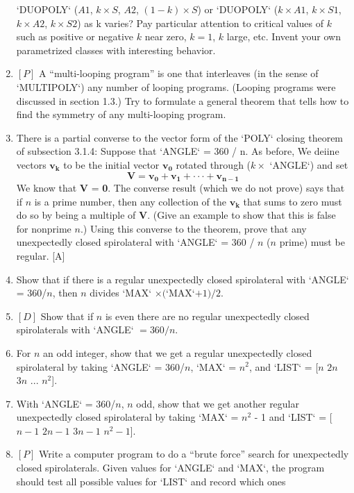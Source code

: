 \documentclass{book}
\begin{document}
\begin{enumerate}
\textsc{`DUOPOLY`} ($A1$, $k \times S$, $A2$, $(1 - k) \times S$) or \textsc{`DUOPOLY`} ($k \times A1$, $k \times S1$,
$k \times A2$, $k \times S2$) as k varies? Pay particular attention to critical values
of $k$ such as positive or negative $k$ near zero, $k = 1$, $k$ large, etc. Invent
your own parametrized classes with interesting behavior.
\item $[P]$ A ``multi-looping program'' is one that interleaves (in the sense of
\textsc{`MULTIPOLY`}) any number of looping programs. (Looping programs were
discussed in section 1.3.) Try to formulate a general theorem that tells
how to find the symmetry of any multi-looping program.
\item There is a partial converse to the vector form of the \textsc{`POLY`} closing
theorem of subsection 3.1.4: Suppose that \textsc{`ANGLE`} = 360 / n. As before, We
deiine vectors $\mathbf{v_k}$ to be the initial vector $\mathbf{v_0}$ rotated through ($k \times $ \textsc{`ANGLE`})
and set
$$\mathbf{V}=\mathbf{v_0}+\mathbf{v_1}+\cdot \cdot \cdot+\mathbf{v_{n-1}}$$
 We know that \textbf{V} = \textbf{0}. The converse result (which we do not prove) says
that if $n$ is a prime number, then any collection of the $\mathbf{v_k}$ that sums to
zero must do so by being a multiple of \textbf{V}. (Give an example to show
that this is false for nonprime $n$.) Using this converse to the theorem,
prove that any unexpectedly closed spirolateral with \textsc{`ANGLE`} = 360 / $n$ ($n$
prime) must be regular. [A]
\item Show that if there is a regular unexpectedly closed spirolateral with
\textsc{`ANGLE`} = 360/$n$, then $n$ divides \textsc{`MAX`} $\times ($\textsc{`MAX`}$ + 1)/2$.  
\item $[D]$ Show that if $n$ is even there are no regular unexpectedly closed
spirolaterals with \textsc{`ANGLE`} $= 360 / n$.  
\item For $n$ an odd integer, show that we get a regular unexpectedly
closed spirolateral by taking \textsc{`ANGLE`} = 360/$n$, \textsc{`MAX`} = $n^2$, and \textsc{`LIST`} = [$n$ $2n$ $3n$ ... $n^2$].
\item With \textsc{`ANGLE`} = 360/$n$, $n$ odd, show that we get another regular
unexpectedly closed spirolateral by taking \textsc{`MAX`} = $n^2$ - 1 and \textsc{`LIST`} = [$n-1$ $2n-1$ $3n-1$ $n^2-1$].
\item $[P]$ Write a computer program to do a ``brute force'' search for
unexpectedly closed spirolaterals. Given values for \textsc{`ANGLE`} and \textsc{`MAX`}, the
program should test all possible values for \textsc{`LIST`} and record which ones

\end{enumerate}
\end{document}
